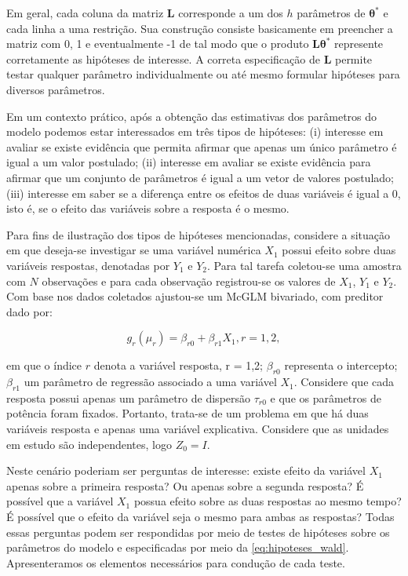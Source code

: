 \documentclass[AMA,STIX1COL]{WileyNJD-v2}
\begin{document}
Em geral, cada coluna da matriz $\boldsymbol{L}$ corresponde a um dos $h$ parâmetros de $\boldsymbol{\theta^{*}}$ e cada linha a uma restrição. Sua construção consiste basicamente em preencher a matriz com 0, 1 e eventualmente -1 de tal modo que o produto $\boldsymbol{L}\boldsymbol{\theta^{*}}$ represente corretamente as hipóteses de interesse. A correta especificação de $\boldsymbol{L}$ permite testar qualquer parâmetro individualmente ou até mesmo formular hipóteses para diversos parâmetros.

Em um contexto prático, após a obtenção das estimativas dos parâmetros do modelo podemos estar interessados em três tipos de hipóteses: (i) interesse em avaliar se existe evidência que permita afirmar que apenas um único parâmetro é igual a um valor postulado; (ii) interesse em avaliar se existe evidência para afirmar que um conjunto de parâmetros é igual a um vetor de valores postulado; (iii) interesse em saber se a diferença entre os efeitos de duas variáveis é igual a 0, isto é, se o efeito das variáveis sobre a resposta é o mesmo.

Para fins de ilustração dos tipos de hipóteses mencionadas, considere a situação em que deseja-se investigar se uma variável numérica $X_1$ possui efeito sobre duas variáveis respostas, denotadas por $Y_1$ e $Y_2$. Para tal tarefa coletou-se uma amostra com $N$ observações e para cada observação registrou-se os valores de $X_1$, $Y_1$ e $Y_2$. Com base nos dados coletados ajustou-se um McGLM bivariado, com preditor dado por:

\begin{equation}
\label{eq:pred_ex}
g_r(\mu_r) = \beta_{r0} + \beta_{r1} X_1, r=1,2,
\end{equation}

\noindent em que o índice $r$ denota a variável resposta, r = 1,2; $\beta_{r0}$ representa o intercepto; $\beta_{r1}$ um parâmetro de regressão associado a uma variável $X_1$. Considere que cada resposta possui apenas um parâmetro de dispersão $\tau_{r0}$ e que os parâmetros de potência foram fixados. Portanto, trata-se de um problema em que há duas variáveis resposta e apenas uma variável explicativa. Considere que as unidades em estudo são independentes, logo $Z_0 = I$. 

Neste cenário poderiam ser perguntas de interesse: existe efeito da variável $X_1$ apenas sobre a primeira resposta? Ou apenas sobre a segunda resposta? É possível que a variável $X_1$ possua efeito sobre as duas respostas ao mesmo tempo? É possível que o efeito da variável seja o mesmo para ambas as respostas? Todas essas perguntas podem ser respondidas por meio de testes de hipóteses sobre os parâmetros do modelo e especificadas por meio da \autoref{eq:hipoteses_wald}. Apresenteramos os elementos necessários para condução de cada teste. 
\end{document}
